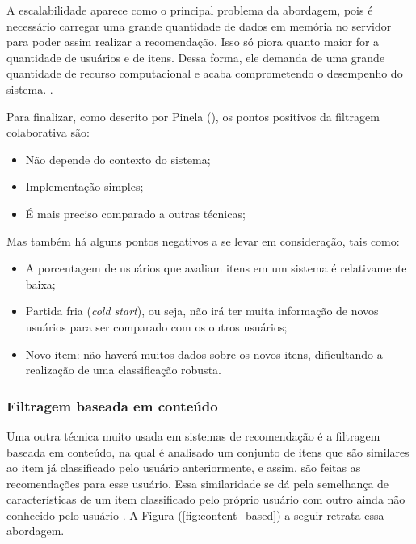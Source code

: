 A escalabilidade aparece como o principal problema da abordagem, pois é necessário carregar uma grande quantidade de dados em memória no servidor para poder assim realizar a recomendação. Isso só piora quanto maior for a quantidade de usuários e de itens. Dessa forma, ele demanda de uma grande quantidade de recurso computacional e acaba comprometendo o desempenho do sistema. \cite{Grover:2017}.

Para finalizar, como descrito por Pinela (\citeyear{Pinela:2017}), os pontos positivos da filtragem colaborativa são:

\begin{itemize}
    \item Não depende do contexto do sistema;
    
    \item Implementação simples;
    
    \item É mais preciso comparado a outras técnicas;
\end{itemize}

Mas também há alguns pontos negativos a se levar em consideração, tais como:

\begin{itemize}
    \item A porcentagem de usuários que avaliam itens em um sistema é relativamente baixa;
    
    \item Partida fria (\textit{cold start}), ou seja, não irá ter muita informação de novos usuários para ser comparado com os outros usuários;
    
    \item Novo item: não haverá muitos dados sobre os novos itens, dificultando a realização de uma classificação robusta.
\end{itemize}

\subsubsection{Filtragem baseada em conteúdo}
\label{Contentbasedfiltering}

Uma outra técnica muito usada em sistemas de recomendação é a filtragem baseada em conteúdo, na qual é analisado um conjunto de itens que são similares ao item já classificado pelo usuário anteriormente, e assim, são feitas as recomendações para esse usuário. Essa similaridade se dá pela semelhança de características de um item classificado pelo próprio usuário com outro ainda não conhecido pelo usuário \cite{Grimaldi:2018}. A Figura (\ref{fig:content_based}) a seguir retrata essa abordagem.

